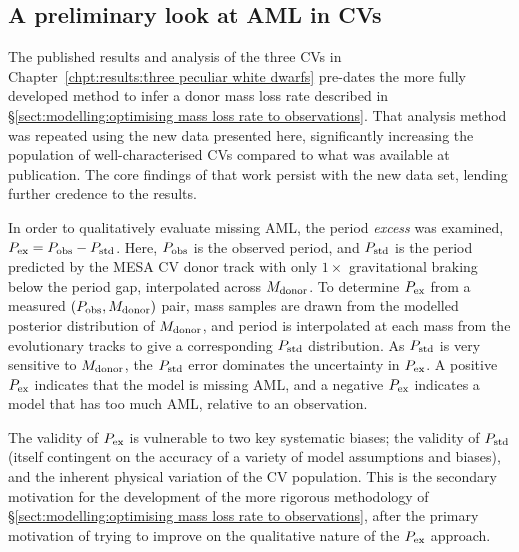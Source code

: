 \subsection{A preliminary look at AML in CVs}
\label{sect:discussion AML}

The published results and analysis of the three CVs in Chapter~\ref{chpt:results:three peculiar white dwarfs} \citep{wild2021} pre-dates the more fully developed method to infer a donor mass loss rate described in \S\ref{sect:modelling:optimising mass loss rate to observations}.
That analysis method was repeated using the new data presented here, significantly increasing the population of well-characterised CVs compared to what was available at publication. The core findings of that work persist with the new data set, lending further credence to the results.

In order to qualitatively evaluate missing AML, the period \textit{excess} was examined, $P_{\rm ex} = P_{\rm obs} - P_{\rm std}$. Here, $P_{\rm obs}$ is the observed period, and $P_{\rm std}$ is the period predicted by the MESA CV donor track with only $1\times$ gravitational braking below the period gap, interpolated across $M_{\rm donor}$.
To determine $P_{\rm ex}$ from a measured $(P_{\rm obs}, M_{\rm donor})$ pair, mass samples are drawn from the modelled posterior distribution of $M_{\rm donor}$, and period is interpolated at each mass from the evolutionary tracks to give a corresponding $P_{\rm std}$ distribution. As $P_{\rm std}$ is very sensitive to $M_{\rm donor}$, the $P_{\rm std}$ error dominates the uncertainty in $P_{\rm ex}$.
A positive $P_{\rm ex}$ indicates that the model is missing AML, and a negative $P_{\rm ex}$ indicates a model that has too much AML, relative to an observation.

The validity of $P_{\rm ex}$ is vulnerable to two key systematic biases; the validity of $P_{\rm std}$ (itself contingent on the accuracy of a variety of model assumptions and biases), and the inherent physical variation of the CV population. This is the secondary motivation for the development of the more rigorous methodology of \S\ref{sect:modelling:optimising mass loss rate to observations}, after the primary motivation of trying to improve on the qualitative nature of the $P_{\rm ex}$ approach.

